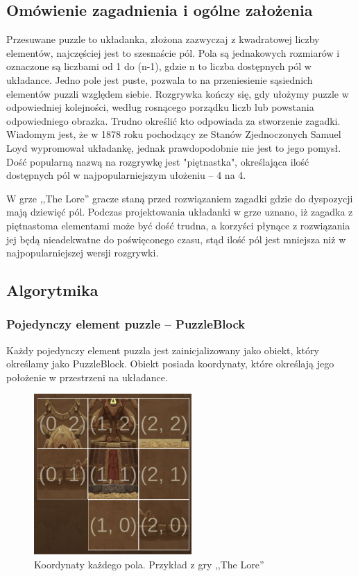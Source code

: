 \documentclass[oneside,polski,logo]{amuthesis}
\begin{document}
\subsection{Omówienie zagadnienia i ogólne założenia}
\par Przesuwane puzzle to układanka, złożona zazwyczaj z kwadratowej liczby elementów, najczęściej jest to szesnaście pól. Pola są jednakowych rozmiarów i oznaczone są liczbami od 1 do (n-1), gdzie n to liczba dostępnych pól w układance. Jedno pole jest puste, pozwala to na przeniesienie sąsiednich elementów puzzli względem siebie. Rozgrywka kończy się, gdy ułożymy puzzle w odpowiedniej kolejności, według rosnącego porządku liczb lub powstania odpowiedniego obrazka. Trudno określić kto odpowiada za stworzenie zagadki. Wiadomym jest, że w 1878 roku pochodzący ze Stanów Zjednoczonych Samuel Loyd wypromował układankę, jednak prawdopodobnie nie jest to jego pomysł. Dość popularną nazwą na rozgrywkę jest "piętnastka", określająca ilość dostępnych pól w najpopularniejszym ułożeniu – 4 na 4.  \cite{przesuwane_puzzle}

W grze ,,The Lore'' gracze staną przed rozwiązaniem zagadki gdzie do dyspozycji mają dziewięć pól. Podczas projektowania układanki w grze uznano, iż zagadka z piętnastoma elementami może być dość trudna, a korzyści płynące z rozwiązania jej będą nieadekwatne do poświęconego czasu, stąd ilość pól jest mniejsza niż w najpopularniejszej wersji rozgrywki.
\subsection{Algorytmika}
\subsubsection{Pojedynczy element puzzle – PuzzleBlock}

\par Każdy pojedynczy element puzzla jest zainicjalizowany jako obiekt, który określamy jako PuzzleBlock. Obiekt posiada koordynaty, które określają jego położenie w przestrzeni na układance.

\begin{figure}[h]
	\centering
	\includegraphics[width=6cm]{images/tyrek/coord_puzzle.png}
	\caption{Koordynaty każdego pola. Przykład z gry ,,The Lore''}
\end{figure}
\end{document}
